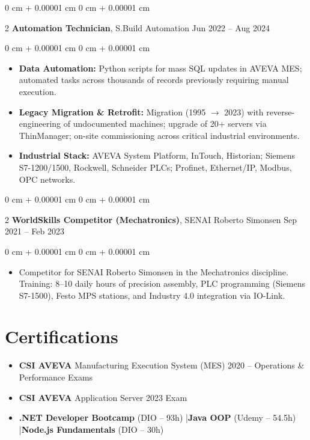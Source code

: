 \documentclass[10pt, letterpaper]{article}
\newenvironment{highlights}{ \begin{itemize}[ topsep=0.10 cm, parsep=0.10 cm, partopsep=0pt,
itemsep=0pt, leftmargin=0 cm + 10pt ] }{ \end{itemize} }
\newenvironment{onecolentry}{ \begin{adjustwidth}{ 0 cm + 0.00001 cm }{ 0 cm + 0.00001 cm }
}{ \end{adjustwidth} }
\newenvironment{twocolentry}[2][]{ \onecolentry \def\secondColumn{#2} \setcolumnwidth{\fill, 4.5 cm}
\begin{paracol}{2} }{ \switchcolumn \raggedleft \secondColumn \end{paracol}
\endonecolentry }
\begin{document}
	\begin{twocolentry}
		{ Jun 2022 -- Aug 2024 } \textbf{Automation Technician}, S.Build Automation
	\end{twocolentry}

	\vspace{0.10 cm}
	\begin{onecolentry}
		\begin{highlights}
			\item \textbf{Data Automation:} Python scripts for mass SQL updates in AVEVA MES; automated tasks across thousands of records previously requiring manual execution.
			\item \textbf{Legacy Migration \& Retrofit:} Migration (1995 $\rightarrow$ 2023) with reverse-engineering of undocumented machines; upgrade of 20+ servers via ThinManager; on-site commissioning across critical industrial environments.
			\item \textbf{Industrial Stack:} AVEVA System Platform, InTouch, Historian; Siemens S7-1200/1500, Rockwell, Schneider PLCs; Profinet, Ethernet/IP, Modbus, OPC networks.
		\end{highlights}
	\end{onecolentry}

	\vspace{0.2 cm}

	\begin{twocolentry}
		{ Sep 2021 -- Feb 2023 } \textbf{WorldSkills Competitor (Mechatronics)}, SENAI Roberto Simonsen
	\end{twocolentry}

	\vspace{0.10 cm}
	\begin{onecolentry}
		\begin{highlights}
			\item Competitor for SENAI Roberto Simonsen in the Mechatronics discipline. Training: 8--10 daily hours of precision assembly, PLC programming (Siemens S7-1500), Festo MPS stations, and Industry 4.0 integration via IO-Link.
		\end{highlights}
	\end{onecolentry}

	\section{Certifications}

	\begin{highlights}
		\item \textbf{CSI AVEVA} Manufacturing Execution System (MES) 2020 -- Operations \& Performance Exams
		\item \textbf{CSI AVEVA} Application Server 2023 Exam
		\item \textbf{.NET Developer Bootcamp} (DIO -- 93h) \quad|\quad \textbf{Java OOP} (Udemy -- 54.5h) \quad|\quad \textbf{Node.js Fundamentals} (DIO -- 30h)
	\end{highlights}
\end{document}
